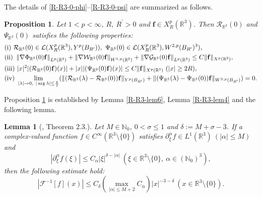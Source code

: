 \documentclass[dvipdfmx,12pt]{article}
\newtheorem{prop}[dfn]{Proposition}
\newtheorem{lem}[dfn]{Lemma}
\begin{document}
The details of \eqref{R-R3-0-phi}--\eqref{R-R3-0-psi} are summarized as follows.
\begin{prop}\label{R-R3-prop3}
Let $1<p<\infty$, $R,~R^\prime>0$ and $\mathbf{f}\in X_R^p(\mathbb{R}^3)$. Then $\mathcal{R}_{\mathbb{R}^3}(0)$ and $\Psi_{\mathbb{R}^3}(0)$ satisfies the following properties:
\begin{align}
&{\rm (i)}~\mathcal{R}_{\mathbb{R}^3}(0)\in \mathcal{L}(X_R^p(\mathbb{R}^3),Y^p(B_{R^\prime})),~\Psi_{\mathbb{R}^3}(0)\in \mathcal{L}(X_R^p(\mathbb{R}^3),W^{2,p}(B_{R^\prime})^3), \label{R-R3-prop3-1} \\
&{\rm (ii)}~ 
\left\|\nabla \Phi_{\mathbb{R}^3}(0)\mathbf{f}\right\|_{L^p(\mathbb{R}^3)}+\left\|\nabla \mathcal{W}_{\mathbb{R}^3}(0)\mathbf{f}\right\|_{W^{1,p}(\mathbb{R}^3)}+\left\|\nabla \mathcal{G}_{\mathbb{R}^3}(0)\mathbf{f}\right\|_{L^p(\mathbb{R}^3)}
\leq 
C\|\mathbf{f}\|_{X^p(\mathbb{R}^3)}, 
\label{R-R3-prop3-2}
\\
&{\rm (iii)}~
 |x|^2|(\mathcal{R}_{\mathbb{R}^3}(0)\mathbf{f})(x)|+|x||(\Psi_{\mathbb{R}^3}(0)\mathbf{f})(x)|\leq C \|\mathbf{f}\|_{X^p(\mathbb{R}^3)}~(|x|\ge 2R), 
\label{R-R3-prop3-3} \\
&{\rm (iv)}~
\lim_{|\lambda|\to 0,~|\arg \lambda|\le \frac{\pi}{2}}(\|(\mathcal{R}_{\mathbb{R}^3}(\lambda)-\mathcal{R}_{\mathbb{R}^3}(0))\mathbf{f}\|_{Y^p(B_{R^\prime})}+\|(\Psi_{\mathbb{R}^3}(\lambda)-\Psi_{\mathbb{R}^3}(0))\mathbf{f}\|_{W^{2,p}(B_{R^\prime})})=0. \label{R-R3-prop3-4}
\end{align}
\end{prop}
Proposition \ref{R-R3-prop3} is established by Lemma \ref{R-R3-lem6}, Lemma \ref{R-R3-lem4} and the following lemma.
\begin{lem}[\cite{SS01}, Theorem 2.3.]\label{SS01-thm2.3.}
Let $M\in\mathbb{N}_0$, $0<\sigma\le 1$ and $\delta:=M+\sigma-3$. If a complex-valued function $f\in C^\infty(\mathbb{R}^3\setminus\{0\})$ satisfies $\partial_\xi^\alpha f\in L^1(\mathbb{R}^3)~(|\alpha|\le M)$ and
\[
|\partial_\xi^\alpha f(\xi)|\le C_\alpha |\xi|^{\delta-|\alpha|}~(\xi\in\mathbb{R}^3\setminus\{0\},~\alpha\in (\mathbb{N}_0)^3),
\] 
then the following estimate hold:
\[
|\mathcal{F}^{-1}[f](x)|\le C_\delta (\max_{|\alpha|\le M+2}C_\alpha) |x|^{-3-\delta}~(x\in\mathbb{R}^3\setminus\{0\}).
\]
\end{lem}
\end{document}
